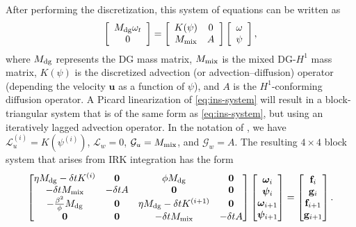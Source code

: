 \documentclass[review]{siamart}
\begin{document}
After performing the discretization, this system of equations can be written as
\begin{equation}
	\label{eq:ins-system}
	\left[ \begin{array}{c} M_{\rm dg} \omega_t \\ 0 \end{array} \right]
	=
	\left[ \begin{array}{cc} K(\psi) & 0 \\ M_{\rm mix} & A \end{array} \right]
	\left[ \begin{array}{c} \omega \\ \psi \end{array} \right],
\end{equation}
where $M_{\rm dg}$ represents the DG mass matrix, $M_{\rm mix}$ is the mixed DG-$H^1$ mass matrix, $K(\psi)$ is the discretized advection (or advection--diffusion) operator (depending the velocity $\bm u$ as a function of $\psi$), and $A$ is the $H^1$-conforming diffusion operator.
A Picard linearization of \eqref{eq:ins-system} will result in a block-triangular system that is of the same form as \eqref{eq:ins-system}, but using an iteratively lagged advection operator.
In the notation of , we have $\mathcal{L}_u^{(i)} = K(\psi^{(i)})$, $\mathcal{L}_w = 0$, $\mathcal{G}_u = M_{\rm mix}$, and $\mathcal{G}_w = A$.
The resulting $4\times4$ block system that arises from IRK integration has the form
\begin{align} \label{eq:vsf-system-1}
	\begin{bmatrix}
		\eta M_{\rm dg} - \delta t K^{(i)} & \mathbf{0} & \phi M_{\rm dg} & \mathbf{0} \\
		-\delta t M_{\rm mix} & -\delta t A & \mathbf{0} & \mathbf{0} \\
		-\tfrac{\beta^2}{\phi}M_{\rm dg} & \mathbf{0} & \eta M_{\rm dg} - \delta t K^{(i+1)} & \mathbf{0} \\
		\mathbf{0} & \mathbf{0} & -\delta t M_{\rm mix} & -\delta t A
	\end{bmatrix}
	\begin{bmatrix} \bm\omega_i \\ \bm\psi_i \\ \bm\omega_{i+1} \\ \bm\psi_{i+1} \end{bmatrix}
	=
	\begin{bmatrix} \mathbf{f}_i \\ \mathbf{g}_i \\ \mathbf{f}_{i+1} \\ \mathbf{g}_{i+1} \end{bmatrix}.
\end{align}
\end{document}
